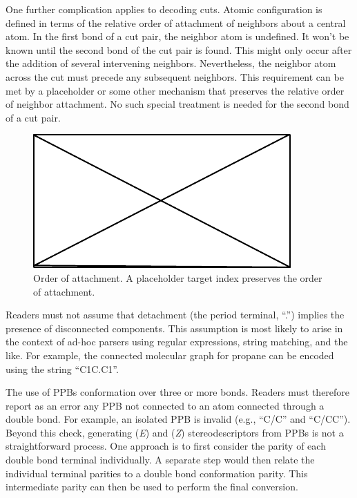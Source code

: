 \documentclass{article}
\begin{document}
One further complication applies to decoding cuts. Atomic configuration is defined in terms of the relative order of attachment of neighbors about a central atom. In the first bond of a cut pair, the neighbor atom is undefined. It won't be known until the second bond of the cut pair is found. This might only occur after the addition of several intervening neighbors. Nevertheless, the neighbor atom across the cut must precede any subsequent neighbors. This requirement can be met by a placeholder or some other mechanism that preserves the relative order of neighbor attachment. No such special treatment is needed for the second bond of a cut pair.

\begin{figure}
    \centering
    \includegraphics{filler}
    \caption{Order of attachment. A placeholder target index preserves the order of attachment.}
    \label{fig:order-of-attachment}
\end{figure}

Readers must not assume that detachment (the period terminal, \enquote{.}) implies the presence of disconnected components. This assumption is most likely to arise in the context of ad-hoc parsers using regular expressions, string matching, and the like. For example, the connected molecular graph for propane can be encoded using the string \enquote{C1C.C1}.

The use of PPBs conformation over three or more bonds. Readers must therefore report as an error any PPB not connected to an atom connected through a double bond. For example, an isolated PPB is invalid (e.g., \enquote{C/C} and \enquote{C/CC}). Beyond this check, generating (\textit{E}) and (\textit{Z}) stereodescriptors from PPBs is not a straightforward process. One approach is to first consider the parity of each double bond terminal individually. A separate step would then relate the individual terminal parities to a double bond conformation parity. This intermediate parity can then be used to perform the final conversion.
\end{document}
